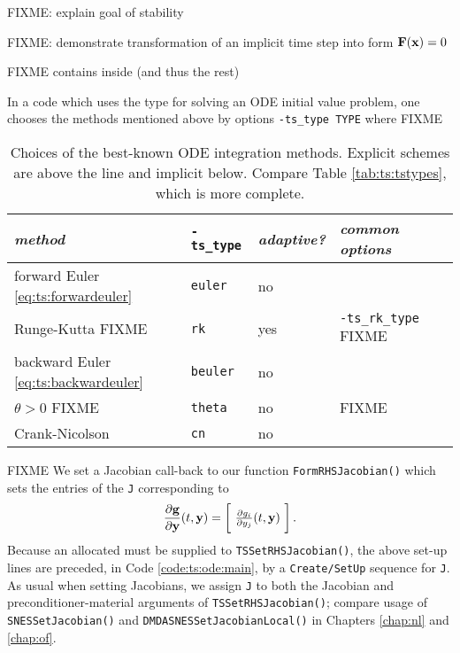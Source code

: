 FIXME: explain goal of stability

FIXME: demonstrate transformation of an implicit time step into form $\mathbf{F}(\mathbf{x})=0$

FIXME \pTS contains \pSNES inside (and thus the rest)

In a \PETSc code which uses the \pTS type for solving an ODE initial value problem, one chooses the methods mentioned above by options \texttt{-ts\_type TYPE} where FIXME

\begin{table}
\small
\begin{tabular}{lllll}
\emph{method}                                & \texttt{-ts\_type} & \emph{adaptive?} & \emph{common options} \\ \hline
forward Euler \eqref{eq:ts:forwardeuler}    & \texttt{euler}  & no & \\
Runge-Kutta  FIXME                          & \texttt{rk}     & yes & \texttt{-ts\_rk\_type} FIXME \\ \hline
backward Euler \eqref{eq:ts:backwardeuler}  & \texttt{beuler} & no & \\
$\theta>0$   FIXME                          & \texttt{theta}  & no & FIXME \\
Crank-Nicolson                              & \texttt{cn}     & no & 
\end{tabular}
\caption{Choices of the best-known ODE integration methods.  Explicit schemes are above the line and implicit below.  Compare Table \ref{tab:ts:tstypes}, which is more complete.} \label{tab:ts:odebasictypes}
\end{table}

FIXME We set a Jacobian call-back to our function \texttt{FormRHSJacobian()} which sets the entries of the \pMat \texttt{J} corresponding to
    $$\frac{\partial \mathbf{g}}{\partial \mathbf{y}}(t,\mathbf{y}) = \begin{bmatrix}\phantom{\bigg|} \frac{\partial g_i}{\partial y_j}(t,\mathbf{y}) \phantom{\bigg|}\end{bmatrix}.$$
Because an allocated \pMat must be supplied to \texttt{TSSetRHSJacobian()}, the above \pTS set-up lines are preceded, in Code \ref{code:ts:ode:main}, by a \texttt{Create/SetUp} sequence for \pMat \texttt{J}.  As usual when setting Jacobians, we assign \texttt{J} to both the Jacobian and preconditioner-material arguments of \texttt{TSSetRHSJacobian()}; compare usage of \texttt{SNESSetJacobian()} and \texttt{DMDASNESSetJacobianLocal()} in Chapters \ref{chap:nl} and \ref{chap:of}.

